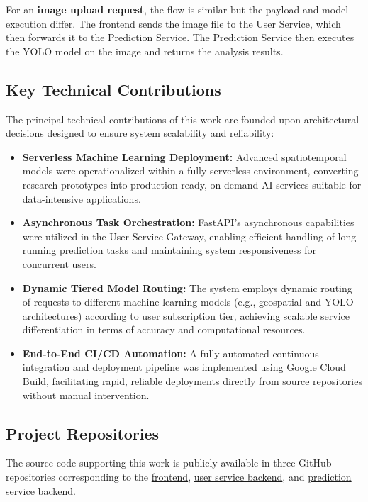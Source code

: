\documentclass[conference]{IEEEtran}
\begin{document}
For an \textbf{image upload request}, the flow is similar but the payload and model execution differ. The frontend sends the image file to the User Service, which then forwards it to the Prediction Service. The Prediction Service then executes the YOLO model on the image and returns the analysis results.

\subsection{Key Technical Contributions}

The principal technical contributions of this work are founded upon architectural decisions designed to ensure system scalability and reliability:

\begin{itemize}
\item \textbf{Serverless Machine Learning Deployment:} Advanced spatiotemporal models were operationalized within a fully serverless environment, converting research prototypes into production-ready, on-demand AI services suitable for data-intensive applications.
\item \textbf{Asynchronous Task Orchestration:} FastAPI’s asynchronous capabilities were utilized in the User Service Gateway, enabling efficient handling of long-running prediction tasks and maintaining system responsiveness for concurrent users.
\item \textbf{Dynamic Tiered Model Routing:} The system employs dynamic routing of requests to different machine learning models (e.g., geospatial and YOLO architectures) according to user subscription tier, achieving scalable service differentiation in terms of accuracy and computational resources.
\item \textbf{End-to-End CI/CD Automation:} A fully automated continuous integration and deployment pipeline was implemented using Google Cloud Build, facilitating rapid, reliable deployments directly from source repositories without manual intervention.
\end{itemize}

\subsection{Project Repositories}
The source code supporting this work is publicly available in three GitHub repositories corresponding to the \href{https://github.com/DV821/hab-frontend}{frontend}, \href{https://github.com/sagar-rsh/hab-backend}{user service backend}, and \href{https://github.com/danieli1245/Harmful-Algal-Bloom-Detection-System}{prediction service backend}.
\end{document}
